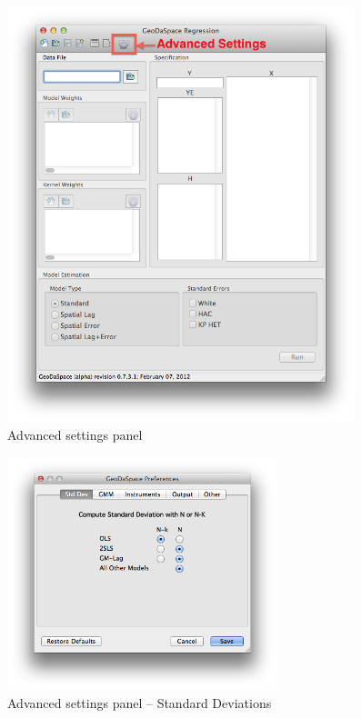 \documentclass{article}
\begin{document}
\begin{figure}[htb]
\centering
\caption{Advanced settings panel}
\label{f:gui_adv}
\includegraphics[width=0.9\textwidth]{GUI_adv.png}
\end{figure}
\FloatBarrier

\begin{figure}[htb]
\centering
\caption{Advanced settings panel -- Standard Deviations}
\label{f:adv_std}
\includegraphics[width=0.7\textwidth]{adv_std.png}
\end{figure}
\end{document}
